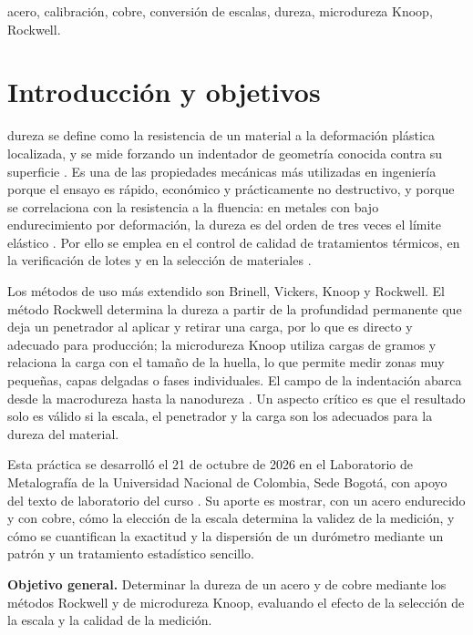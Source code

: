 \documentclass[journal,11pt]{IEEEtran}
\begin{document}
\begin{IEEEkeywords}
acero, calibración, cobre, conversión de escalas, dureza, microdureza Knoop, Rockwell.
\end{IEEEkeywords}

\section{Introducción y objetivos}
 dureza se define como la resistencia de un material a la deformación plástica localizada, y se mide forzando un indentador de geometría conocida contra su superficie \cite{callister,ashby}. Es una de las propiedades mecánicas más utilizadas en ingeniería porque el ensayo es rápido, económico y prácticamente no destructivo, y porque se correlaciona con la resistencia a la fluencia: en metales con bajo endurecimiento por deformación, la dureza es del orden de tres veces el límite elástico \cite{tabor}. Por ello se emplea en el control de calidad de tratamientos térmicos, en la verificación de lotes y en la selección de materiales \cite{asmhb}.

Los métodos de uso más extendido son Brinell, Vickers, Knoop y Rockwell. El método Rockwell \cite{astm18,iso6508} determina la dureza a partir de la profundidad permanente que deja un penetrador al aplicar y retirar una carga, por lo que es directo y adecuado para producción; la microdureza Knoop \cite{astm384,iso4545,knoop} utiliza cargas de gramos y relaciona la carga con el tamaño de la huella, lo que permite medir zonas muy pequeñas, capas delgadas o fases individuales. El campo de la indentación abarca desde la macrodureza hasta la nanodureza \cite{broitman}. Un aspecto crítico es que el resultado solo es válido si la escala, el penetrador y la carga son los adecuados para la dureza del material.

Esta práctica se desarrolló el 21 de octubre de 2026 en el Laboratorio de Metalografía de la Universidad Nacional de Colombia, Sede Bogotá, con apoyo del texto de laboratorio del curso \cite{forero}. Su aporte es mostrar, con un acero endurecido y con cobre, cómo la elección de la escala determina la validez de la medición, y cómo se cuantifican la exactitud y la dispersión de un durómetro mediante un patrón y un tratamiento estadístico sencillo.

\textbf{Objetivo general.} Determinar la dureza de un acero y de cobre mediante los métodos Rockwell y de microdureza Knoop, evaluando el efecto de la selección de la escala y la calidad de la medición.
\end{document}
